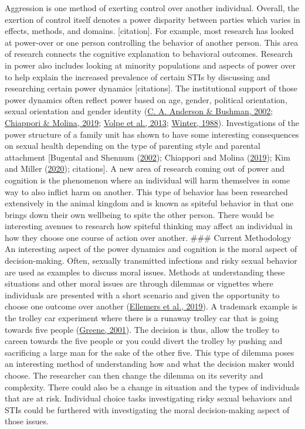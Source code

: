 \documentclass[
  donotrepeattitle,doc, 12pt, a4paper,floatsintext]{apa7}
\begin{document}
Aggression is one method of exerting control over another individual. Overall, the exertion of control itself denotes a power disparity between parties which varies in effects, methods, and domains. {[}citation{]}. For example, most research has looked at power-over or one person controlling the behavior of another person. This area of research connects the cognitive explanation to behavioral outcomes. Research in power also includes looking at minority populations and aspects of power over to help explain the increased prevalence of certain STIs by discussing and researching certain power dynamics {[}citations{]}. The institutional support of those power dynamics often reflect power based on age, gender, political orientation, sexual orientation and gender identity (\protect\hyperlink{ref-anderson2002}{C. A. Anderson \& Bushman, 2002}; \protect\hyperlink{ref-chiappori2019}{Chiappori \& Molina, 2019}; \protect\hyperlink{ref-volpe2013}{Volpe et al., 2013}; \protect\hyperlink{ref-winter1988}{Winter, 1988}). Investigations of the power structure of a family unit has shown to have some interesting consequences on sexual health depending on the type of parenting style and parental attachment {[}Bugental and Shennum (\protect\hyperlink{ref-bugental2002}{2002}); Chiappori and Molina (\protect\hyperlink{ref-chiappori2019}{2019}); Kim and Miller (\protect\hyperlink{ref-kim2020}{2020}); citations{]}. A new area of research coming out of power and cognition is the phenomenon where an individual will harm themselves in some way to also inflict harm on another. This type of behavior has been researched extensively in the animal kingdom and is known as spiteful behavior in that one brings down their own wellbeing to spite the other person. There would be interesting avenues to research how spiteful thinking may affect an individual in how they choose one course of action over another.
\#\#\# Current Methodology
An interesting aspect of the power dynamics and cognition is the moral aspect of decision-making. Often, sexually transmitted infections and risky sexual behavior are used as examples to discuss moral issues. Methods at understanding these situations and other moral issues are through dilemmas or vignettes where individuals are presented with a short scenario and given the opportunity to choose one outcome over another (\protect\hyperlink{ref-ellemers2019}{Ellemers et al., 2019}). A trademark example is the trolley car experiment where there is a runaway trolley car that is going towards five people (\protect\hyperlink{ref-greene2001}{Greene, 2001}). The decision is thus, allow the trolley to careen towards the five people or you could divert the trolley by pushing and sacrificing a large man for the sake of the other five. This type of dilemma poses an interesting method of understanding how and what the decision maker would choose. The researcher can then change the dilemma on its severity and complexity. There could also be a change in situation and the types of individuals that are at risk. Individual choice tasks investigating risky sexual behaviors and STIs could be furthered with investigating the moral decision-making aspect of those issues.
\end{document}
